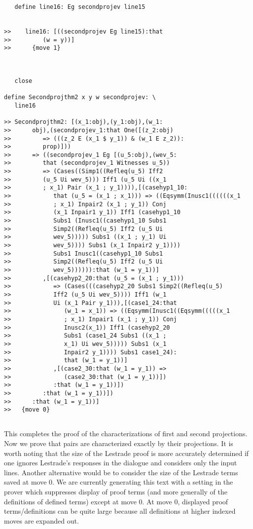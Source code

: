 \documentclass[12pt]{article}
\begin{document}
\begin{verbatim}
   define line16: Eg secondprojev line15


>>    line16: [((secondprojev Eg line15):that
>>         (w = y))]
>>      {move 1}



   close

define Secondprojthm2 x y w secondprojev: \
   line16

>> Secondprojthm2: [(x_1:obj),(y_1:obj),(w_1:
>>      obj),(secondprojev_1:that One([(z_2:obj)
>>         => (((z_2 E (x_1 $ y_1)) & (w_1 E z_2)):
>>         prop)]))
>>      => ((secondprojev_1 Eg [(u_5:obj),(wev_5:
>>         that (secondprojev_1 Witnesses u_5))
>>         => (Cases((Simp1((Refleq(u_5) Iff2
>>         (u_5 Ui wev_5))) Iff1 (u_5 Ui ((x_1
>>         ; x_1) Pair (x_1 ; y_1)))),[(casehyp1_10:
>>            that (u_5 = (x_1 ; x_1))) => ((Eqsymm(Inusc1((((((x_1
>>            ; x_1) Inpair2 (x_1 ; y_1)) Conj
>>            (x_1 Inpair1 y_1)) Iff1 (casehyp1_10
>>            Subs1 (Inusc1((casehyp1_10 Subs1
>>            Simp2((Refleq(u_5) Iff2 (u_5 Ui
>>            wev_5))))) Subs1 ((x_1 ; y_1) Ui
>>            wev_5)))) Subs1 (x_1 Inpair2 y_1))))
>>            Subs1 Inusc1((casehyp1_10 Subs1
>>            Simp2((Refleq(u_5) Iff2 (u_5 Ui
>>            wev_5)))))):that (w_1 = y_1))]
>>         ,[(casehyp2_20:that (u_5 = (x_1 ; y_1)))
>>            => (Cases(((casehyp2_20 Subs1 Simp2((Refleq(u_5)
>>            Iff2 (u_5 Ui wev_5)))) Iff1 (w_1
>>            Ui (x_1 Pair y_1))),[(case1_24:that
>>               (w_1 = x_1)) => ((Eqsymm(Inusc1((Eqsymm(((((x_1
>>               ; x_1) Inpair1 (x_1 ; y_1)) Conj
>>               Inusc2(x_1)) Iff1 (casehyp2_20
>>               Subs1 (case1_24 Subs1 ((x_1 ;
>>               x_1) Ui wev_5))))) Subs1 (x_1
>>               Inpair2 y_1)))) Subs1 case1_24):
>>               that (w_1 = y_1))]
>>            ,[(case2_30:that (w_1 = y_1)) =>
>>               (case2_30:that (w_1 = y_1))])
>>            :that (w_1 = y_1))])
>>         :that (w_1 = y_1))])
>>      :that (w_1 = y_1))]
>>   {move 0}


\end{verbatim}

This completes the proof of the characterizations of first and second projections.  Now we prove that pairs are characterized exactly by their projections.  It is worth noting that
the size of the Lestrade proof is more accurately determined if one ignores Lestrade's responses in the dialogue and considers only the input lines.  Another alternative would be to consider the size of the Lestrade terms saved at move 0.  We are currently generating this text with a setting in the prover which suppresses display of proof terms
(and more generally of the definitions of defined terms) except at move 0.  At move 0, displayed proof terms/definitions can be quite large because all definitions at higher indexed moves are expanded out.
\end{document}
